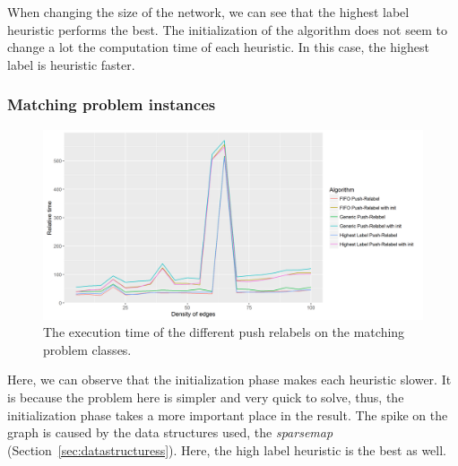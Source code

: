 When changing the size of the network, we can see that the highest label heuristic performs the best. The initialization of the algorithm does not seem to change a lot the computation time of each heuristic. In this case, the highest label is heuristic faster.


\subsubsection{Matching problem instances}
\begin{figure}[H]
\begin{center}
\includegraphics[scale=0.54]{images/meanmatchingpr.png}
\caption{The execution time of the different push relabels on the matching problem classes.}
\label{fig:mean_matching_pr}
\end{center}
\end{figure}

Here, we can observe that the initialization phase makes each heuristic slower. It is because the problem here is simpler and very quick to solve, thus, the initialization phase takes a more important place in the result. The spike on the graph is caused by the data structures used, the \textit{sparsemap} (Section~\ref{sec:datastructuress}). Here, the high label heuristic is the best as well.


